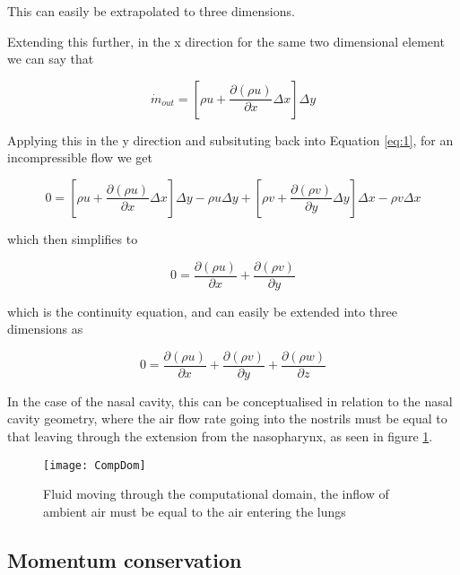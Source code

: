     This can easily be extrapolated to three dimensions.


Extending this further, in the x direction for the same two dimensional element we can say that

\begin{equation} \label{eq:22}
\dot{m}_{out} = [\rho u + \frac{\partial(\rho u)}{\partial x}\Delta x]\Delta y
\end{equation}

Applying this in the y direction and subsituting back into Equation \ref{eq:1}, for an incompressible flow we get
 
\begin{dmath} \label{eq:23}
0 = [\rho u + \frac{\partial(\rho u)}{\partial x}\Delta x]\Delta y - \rho u \Delta y 
+ [\rho v + \frac{\partial(\rho v)}{\partial y}\Delta y]\Delta x - \rho v \Delta x  
\end{dmath}

which then simplifies to

\begin{equation} \label{eq:24}
  0 = \frac{\partial(\rho u)}{\partial x} + \frac{\partial(\rho v)}{\partial y}
\end{equation}

which is the continuity equation, and can easily be extended into three dimensions as

\begin{equation} \label{eq:25}
  0 = \frac{\partial(\rho u)}{\partial x} + \frac{\partial(\rho v)}{\partial y} + \frac{\partial(\rho w)}{\partial z}
\end{equation}


    In the case of the nasal cavity, this can be conceptualised in relation to the nasal cavity geometry, where the air flow rate going into the nostrils must be equal to that leaving through the extension from the nasopharynx, as seen in figure \ref{fig:CompDom}.

\begin{figure}   
  \centering
  \texttt{[image: CompDom]}
  \caption{Fluid moving through the computational domain, the inflow of ambient air must be equal to the air entering the lungs}
  \label{fig:CompDom}
\end{figure}

    \subsection{Momentum conservation}

